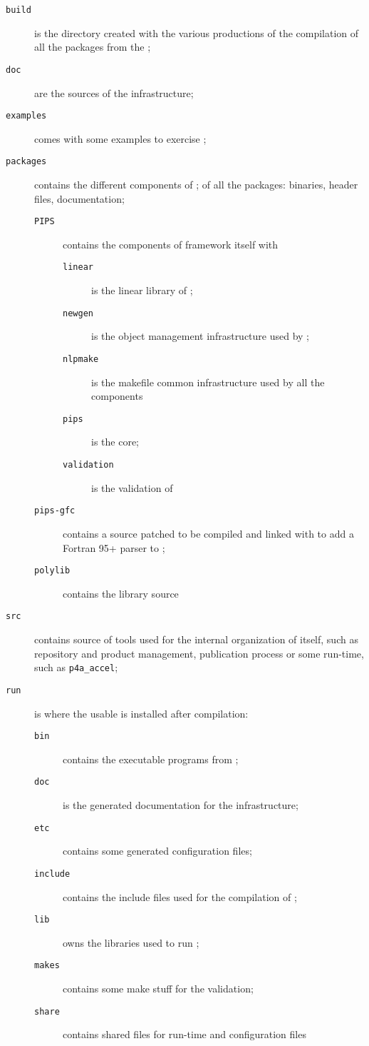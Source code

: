 \documentclass[a4paper]{article}
\begin{document}
\begin{description}
\item[\texttt{build}] is the directory created with the various productions
  of the compilation of all the \Apfa packages from the \Aautotools;
\item[\texttt{doc}] are the sources of the \Apfa infrastructure;
\item[\texttt{examples}] comes with some examples to exercise \Apfa;
\item[\texttt{packages}] contains the different components of \Apfa; of
  all the \Apfa packages: binaries, header files, documentation;
  \begin{description}
  \item[\texttt{PIPS}] contains the components of \Apips framework itself
    with
    \begin{description}
    \item[\texttt{linear}] is the \Apips linear library of \Apips;
    \item[\texttt{newgen}] is the object management infrastructure used by
      \Apips;
    \item[\texttt{nlpmake}] is the makefile common infrastructure used by
      all the \Apips components
    \item[\texttt{pips}] is the \Apips core;
    \item[\texttt{validation}] is the validation of \Apips
    \end{description}
  \item[\texttt{pips-gfc}] contains a  source patched to be
    compiled and linked with \Apips to add a Fortran 95+ parser to \Apips;
  \item[\texttt{polylib}] contains the \Apolylib library source
  \end{description}
\item[\texttt{src}] contains source of tools used for the internal
  organization of \Apfa itself, such as repository and product management,
  publication process or some run-time, such as \verb|p4a_accel|;
\item[\texttt{run}] is where the usable \Apfa is installed after
  compilation:
  \begin{description}
  \item[\texttt{bin}] contains the executable programs from \Apfa;
  \item[\texttt{doc}] is the generated documentation for the \Apfa
    infrastructure; 
  \item[\texttt{etc}] contains some generated configuration files;
  \item[\texttt{include}] contains the include files used for the
    compilation of \Apfa;
  \item[\texttt{lib}] owns the libraries used to run \Apfa;
  \item[\texttt{makes}] contains some make stuff for the \Apips
    validation;
  \item[\texttt{share}] contains shared files for run-time and
    configuration files
  \end{description}
\end{description}
\end{document}
